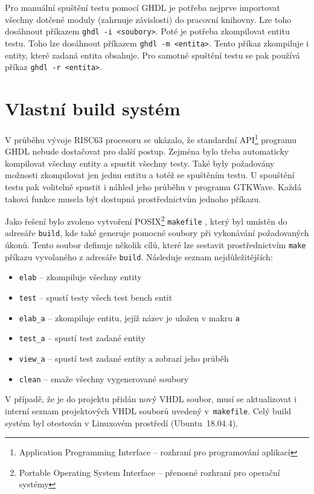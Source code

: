 \documentclass[
  digital, %
  color,   %
  table,   %
  twoside, %
  nolof,   %
  nolot,   %
]{fithesis3}
\begin{document}
Pro manuální spuštění testu pomocí GHDL je potřeba nejprve importovat všechny dotčené moduly (zahrnuje závislosti) do pracovní knihovny. Lze toho dosáhnout příkazem \texttt{ghdl -i <soubory>}. Poté je potřeba zkompilovat entitu testu. Toho lze dosáhnout příkazem \texttt{ghdl~-m~<entita>}. Tento příkaz zkompiluje i entity, které zadaná entita obsahuje. Pro samotné spuštění testu se pak používá příkaz \texttt{ghdl -r <entita>}.

\section{Vlastní build systém}
V průběhu vývoje RISC63 procesoru se ukázalo, že standardní API\footnote{Application Programming Interface -- rozhraní pro programování aplikací} programu GHDL nebude dostačovat pro další postup. Zejména bylo třeba automaticky kompilovat všechny entity a spustit všechny testy. Také byly požadovány možnosti zkompilovat jen jednu entitu a totéž se spuštěním testu. U spouštění testu pak volitelně spustit i náhled jeho průběhu v programu GTKWave. Každá taková funkce musela být dostupná prostřednictvím jednoho příkazu.

Jako řešení bylo zvoleno vytvoření POSIX\footnote{Portable Operating System Interface -- přenosné rozhraní pro operační systémy} \texttt{makefile} \parencite{ieee18}, který byl umístěn do adresáře \texttt{build}, kde také generuje pomocné soubory při vykonávání požadovaných úkonů. Tento soubor definuje několik cílů, které lze sestavit prostřednictvím \texttt{make} příkazu vyvolaného z adresáře \texttt{build}. Následuje seznam nejdůležitějších:

\begin{itemize}
    \item \texttt{elab} -- zkompiluje všechny entity
    \item \texttt{test} -- spustí testy všech test bench entit
    \item \texttt{elab\_a} -- zkompiluje entitu, jejíž název je uložen v makru \texttt{a}
    \item \texttt{test\_a} -- spustí test zadané entity
    \item \texttt{view\_a} -- spustí test zadané entity a zobrazí jeho průběh
    \item \texttt{clean} -- smaže všechny vygenerované soubory
\end{itemize}

V případě, že je do projektu přidán nový VHDL soubor, musí se aktualizovat i interní seznam projektových VHDL souborů uvedený v~\texttt{makefile}. Celý build systém byl otestován v Linuxovém prostředí (Ubuntu~18.04.4).
\end{document}
